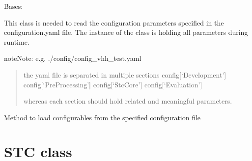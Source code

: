 \documentclass[letterpaper,10pt,english,openany,oneside]{sphinxmanual}
\begin{document}
\begin{fulllineitems}
\label{\detokenize{Configuration:stc.Configuration.Configuration}}
Bases: 

This class is needed to read the configuration parameters specified in the configuration.yaml file.
The instance of the class is holding all parameters during runtime.

\begin{sphinxadmonition}{note}{Note:}
e.g. ./config/config\_vhh\_test.yaml
\begin{quote}

the yaml file is separated in multiple sections
config{[}‘Development’{]}
config{[}‘PreProcessing’{]}
config{[}‘StcCore’{]}
config{[}‘Evaluation’{]}

whereas each section should hold related and meaningful parameters.
\end{quote}
\end{sphinxadmonition}

\begin{fulllineitems}
\label{\detokenize{Configuration:stc.Configuration.Configuration.loadConfig}}
Method to load configurables from the specified configuration file

\end{fulllineitems}


\end{fulllineitems}



\section{STC class}
\label{\detokenize{STC:stc-class}}\label{\detokenize{STC::doc}}
\end{document}
